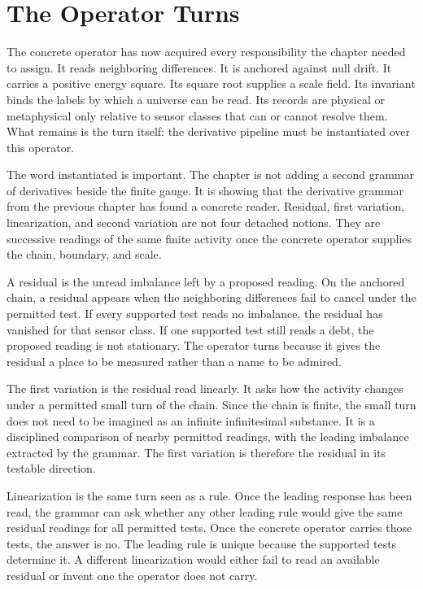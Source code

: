 \section{The Operator Turns}

The concrete operator has now acquired every responsibility the chapter
needed to assign. It reads neighboring differences. It is anchored against
null drift. It carries a positive energy square. Its square root supplies a
scale field. Its invariant binds the labels by which a universe can be read.
Its records are physical or metaphysical only relative to sensor classes
that can or cannot resolve them. What remains is the turn itself: the
derivative pipeline must be instantiated over this operator.

The word instantiated is important. The chapter is not adding a second
grammar of derivatives beside the finite gauge. It is showing that the
derivative grammar from the previous chapter has found a concrete reader.
Residual, first variation, linearization, and second variation are not four
detached notions. They are successive readings of the same finite activity
once the concrete operator supplies the chain, boundary, and scale.

A residual is the unread imbalance left by a proposed reading. On the
anchored chain, a residual appears when the neighboring differences fail to
cancel under the permitted test. If every supported test reads no imbalance,
the residual has vanished for that sensor class. If one supported test
still reads a debt, the proposed reading is not stationary. The operator
turns because it gives the residual a place to be measured rather than a
name to be admired.

The first variation is the residual read linearly. It asks how the activity
changes under a permitted small turn of the chain. Since the chain is
finite, the small turn does not need to be imagined as an infinite
infinitesimal substance. It is a disciplined comparison of nearby permitted
readings, with the leading imbalance extracted by the grammar. The first
variation is therefore the residual in its testable direction.

Linearization is the same turn seen as a rule. Once the leading response has
been read, the grammar can ask whether any other leading rule would give the
same residual readings for all permitted tests. Once the concrete operator
carries those tests, the answer is no. The leading rule is unique because
the supported tests determine it. A different linearization would either
fail to read an available residual or invent one the operator does not
carry.

